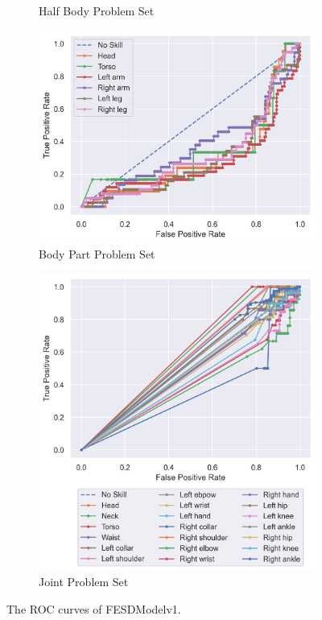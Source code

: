 \begin{figure}
\begin{subfigure}[b]{0.47\linewidth}
      \caption[]{Half Body Problem Set}
      \label{fig:hb_roc_v1}
  \end{subfigure}
  \hfill
  \begin{subfigure}[b]{0.47\linewidth}
      \centering
      \includegraphics[width=\textwidth]{figures/Results/v1/roc/bp.png}
      \caption[]{Body Part Problem Set}
      \label{fig:bp_roc_v1}
  \end{subfigure}
  \hfill
  \begin{subfigure}[b]{0.47\linewidth}
      \centering
      \includegraphics[width=\textwidth]{figures/Results/v1/roc/jt.png}
      \caption[]{Joint Problem Set}
      \label{fig:jt_roc_v1}
  \end{subfigure}
  \caption[ROC Curves of FESDModelv1]{The ROC curves of FESDModelv1.}
  \label{fig:roc_v1}
\end{figure}


